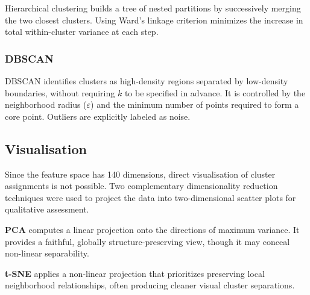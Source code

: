 \documentclass[runningheads,a4paper,11pt]{report}
\begin{document}
Hierarchical clustering builds a tree of nested partitions by successively merging the two closest clusters. Using Ward's linkage criterion minimizes the increase in total within-cluster variance at each step.

\subsubsection{DBSCAN}

DBSCAN identifies clusters as high-density regions separated by low-density boundaries, without requiring $k$ to be specified in advance. It is controlled by the neighborhood radius ($\varepsilon$) and the minimum number of points required to form a core point. Outliers are explicitly labeled as noise.

\subsection{Visualisation}
\label{section:visualisation}

Since the feature space has 140 dimensions, direct visualisation of cluster assignments is not possible. Two complementary dimensionality reduction techniques were used to project the data into two-dimensional scatter plots for qualitative assessment.

\textbf{PCA} computes a linear projection onto the directions of maximum variance. It provides a faithful, globally structure-preserving view, though it may conceal non-linear separability.

\textbf{t-SNE} applies a non-linear projection that prioritizes preserving local neighborhood relationships, often producing cleaner visual cluster separations.
\end{document}
